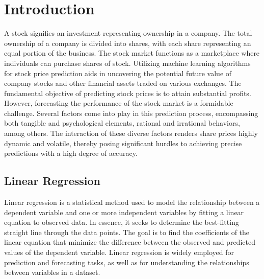 \documentclass[conference,onecolumn,11pt]{IEEEtran}
\begin{document}
\section{Introduction}
A stock signifies an investment representing ownership in a company. The total ownership of a company is divided into shares, with each share representing an equal portion of the business. The stock market functions as a marketplace where individuals can purchase shares of stock. 
Utilizing machine learning algorithms for stock price prediction aids in uncovering the potential future value of company stocks and other financial assets traded on various exchanges.\cite{Vijh2020} The fundamental objective of predicting stock prices is to attain substantial profits. However, forecasting the performance of the stock market is a formidable challenge. Several factors come into play in this prediction process, encompassing both tangible and psychological elements, rational and irrational behaviors, among others.
The interaction of these diverse factors renders share prices highly dynamic and volatile, thereby posing significant hurdles to achieving precise predictions with a high degree of accuracy.


\subsection*{Linear Regression}

Linear regression is a statistical method used to model the relationship between a dependent variable and one or more independent variables by fitting a linear equation to observed data. In essence, it seeks to determine the best-fitting straight line through the data points. The goal is to find the coefficients of the linear equation that minimize the difference between the observed and predicted values of the dependent variable. Linear regression is widely employed for prediction and forecasting tasks, as well as for understanding the relationships between variables in a dataset.
\end{document}
